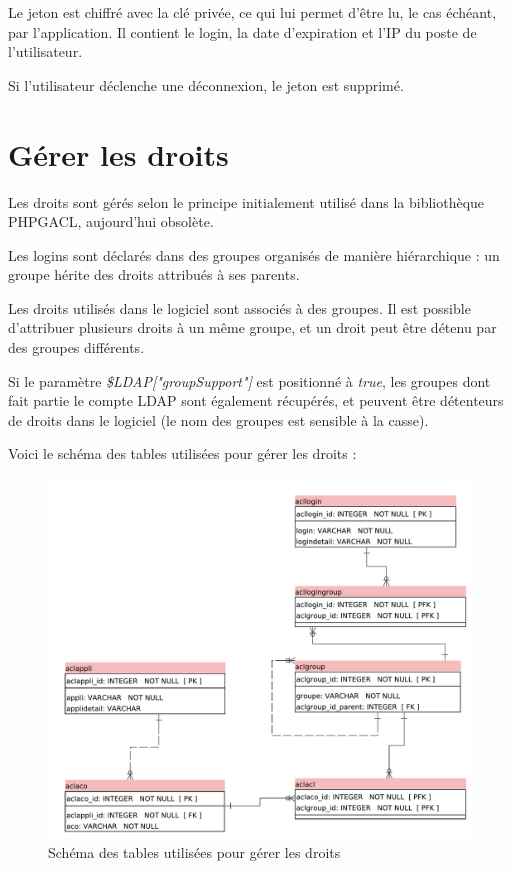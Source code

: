 Le jeton est chiffré avec la clé privée, ce qui lui permet d'être lu, le cas échéant, par l'application. Il contient le login, la date d'expiration et l'IP du poste de l'utilisateur. 

Si l'utilisateur déclenche une déconnexion, le jeton est supprimé.

\section{Gérer les droits}

Les droits sont gérés selon le principe initialement utilisé dans la bibliothèque PHPGACL, aujourd'hui obsolète. 

Les logins sont déclarés dans des groupes organisés de manière hiérarchique : un groupe hérite des droits attribués à ses parents.

Les droits utilisés dans le logiciel sont associés à des groupes. Il est possible d'attribuer plusieurs droits à un même groupe, et un droit peut être détenu par des groupes différents.

Si le paramètre \textit{\$LDAP["groupSupport"]} est positionné à \textit{true}, les groupes dont fait partie le compte LDAP sont également récupérés, et peuvent être détenteurs de droits dans le logiciel (le nom des groupes est sensible à la casse).

Voici le schéma des tables utilisées pour gérer les droits :

\begin{figure}[H]
\includegraphics[width=\linewidth]{dessin/acl_only}
\caption{Schéma des tables utilisées pour gérer les droits}
\end{figure}

